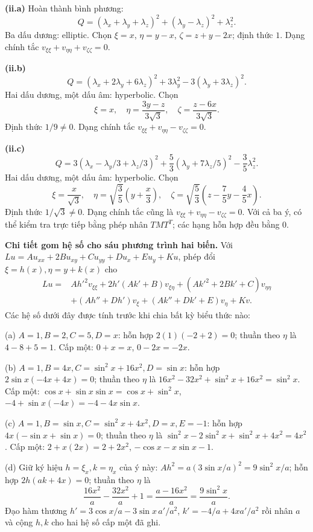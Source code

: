 \documentclass[10pt,a4paper]{article}
\begin{document}
\textbf{(ii.a)} Hoàn thành bình phương:
\[Q=(\lambda_x+\lambda_y+\lambda_z)^2+(\lambda_y-\lambda_z)^2+\lambda_z^2.\]
Ba dấu dương: elliptic. Chọn $\xi=x$, $\eta=y-x$, $\zeta=z+y-2x$; định thức $1$. Dạng chính tắc $v_{\xi\xi}+v_{\eta\eta}+v_{\zeta\zeta}=0$.

\textbf{(ii.b)}
\[Q=(\lambda_x+2\lambda_y+6\lambda_z)^2+3\lambda_y^2-3(\lambda_y+3\lambda_z)^2.\]
Hai dấu dương, một dấu âm: hyperbolic. Chọn
\[\xi=x,\quad\eta=\frac{3y-z}{3\sqrt3},\quad\zeta=\frac{z-6x}{3\sqrt3}.\]
Định thức $1/9\ne0$. Dạng chính tắc $v_{\xi\xi}+v_{\eta\eta}-v_{\zeta\zeta}=0$.

\textbf{(ii.c)}
\[Q=3(\lambda_x-\lambda_y/3+\lambda_z/3)^2+\frac53(\lambda_y+7\lambda_z/5)^2-\frac35\lambda_z^2.\]
Hai dấu dương, một dấu âm: hyperbolic. Chọn
\[\xi=\frac{x}{\sqrt3},\quad\eta=\sqrt{\frac35}\left(y+\frac x3\right),\quad
\zeta=\sqrt{\frac53}\left(z-\frac75y-\frac45x\right).\]
Định thức $1/\sqrt3\ne0$. Dạng chính tắc cũng là $v_{\xi\xi}+v_{\eta\eta}-v_{\zeta\zeta}=0$. Với cả ba ý, có thể kiểm tra trực tiếp bằng phép nhân $TMT^T$; các hạng hỗn hợp đều bằng $0$.

\textbf{Chi tiết gom hệ số cho sáu phương trình hai biến.} Với $Lu=Au_{xx}+2Bu_{xy}+Cu_{yy}+Du_x+Eu_y+Ku$, phép đổi $\xi=h(x),\eta=y+k(x)$ cho
\[\begin{aligned}
L u={}&Ah'^2v_{\xi\xi}+2h'(Ak'+B)v_{\xi\eta}
+(Ak'^2+2Bk'+C)v_{\eta\eta}\\
&+(Ah''+Dh')v_\xi+(Ak''+Dk'+E)v_\eta+Kv.
\end{aligned}\]
Các hệ số dưới đây được tính trước khi chia bất kỳ biểu thức nào:

(a) $A=1,B=2,C=5,D=x$: hỗn hợp $2(1)(-2+2)=0$; thuần theo $\eta$ là $4-8+5=1$. Cấp một: $0+x=x$, $0-2x=-2x$.

(b) $A=1,B=4x,C=\sin^2x+16x^2,D=\sin x$: hỗn hợp $2\sin x(-4x+4x)=0$; thuần theo $\eta$ là $16x^2-32x^2+\sin^2x+16x^2=\sin^2x$. Cấp một: $\cos x+\sin x\sin x=\cos x+\sin^2x$, $-4+\sin x(-4x)=-4-4x\sin x$.

(c) $A=1,B=\sin x,C=\sin^2x+4x^2,D=x,E=-1$: hỗn hợp $4x(-\sin x+\sin x)=0$; thuần theo $\eta$ là $\sin^2x-2\sin^2x+\sin^2x+4x^2=4x^2$. Cấp một: $2+x(2x)=2+2x^2$, $-\cos x-x\sin x-1$.

(d) Giữ ký hiệu $h=\xi_x,k=\eta_x$ của ý này: $Ah^2=a(3\sin x/a)^2=9\sin^2x/a$; hỗn hợp $2h(ak+4x)=0$; thuần theo $\eta$ là
\[\frac{16x^2}a-\frac{32x^2}a+1=\frac{a-16x^2}a=\frac{9\sin^2x}a.\]
Đạo hàm thương $h'=3\cos x/a-3\sin x\,a'/a^2$, $k'=-4/a+4xa'/a^2$ rồi nhân $a$ và cộng $h,k$ cho hai hệ số cấp một đã ghi.
\end{document}
